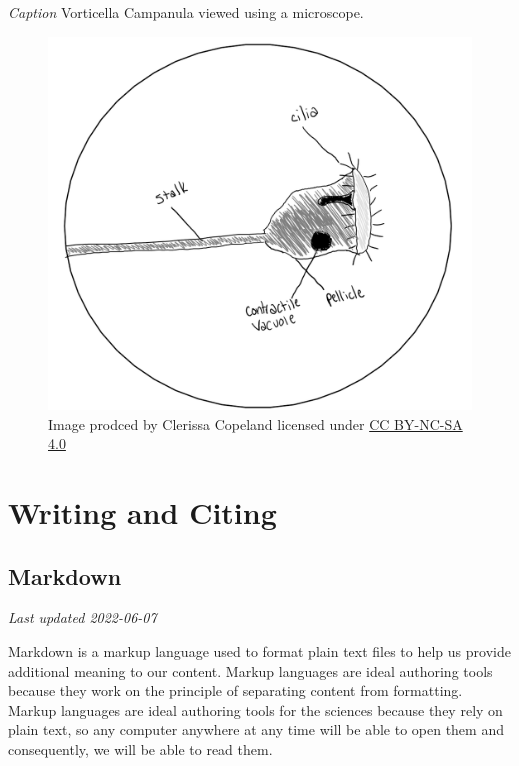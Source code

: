 \documentclass[
]{book}
\begin{document}
\emph{Caption} Vorticella Campanula viewed using a microscope.

\begin{figure}
\centering
\includegraphics{images/JSSG_poor-journal-style-fig-1.png}
\caption{Image prodced by Clerissa Copeland licensed under \href{https://creativecommons.org/licenses/by-nc-sa/4.0/}{CC BY-NC-SA 4.0}}
\end{figure}

\hypertarget{part-writing-and-citing}{%
\part*{Writing and Citing}\label{part-writing-and-citing}}

\hypertarget{markdown-1}{%
\chapter{Markdown}\label{markdown-1}}

\emph{Last updated 2022-06-07}

Markdown is a markup language used to format plain text files to help us provide additional meaning to our content. Markup languages are ideal authoring tools because they work on the principle of separating content from formatting. Markup languages are ideal authoring tools for the sciences because they rely on plain text, so any computer anywhere at any time will be able to open them and consequently, we will be able to read them.
\end{document}

